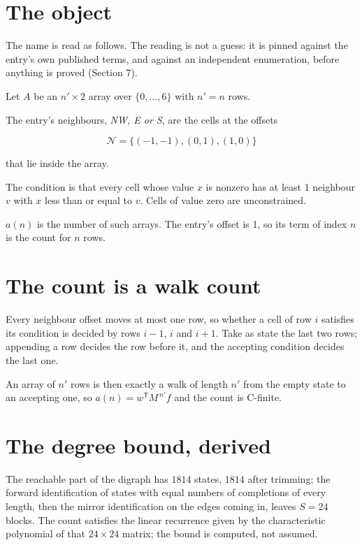 \documentclass[11pt]{article}
\theoremstyle{definition}
\begin{document}
\section{The object}

The name is read as follows. The reading is not a guess: it is pinned against the entry's own published terms, and against an independent enumeration, before anything is proved (Section 7).

Let $A$ be an $n' \times 2$ array over $\{0,\dots,6\}$ with $n' = n$ rows.

The entry's neighbours, {\itshape NW, E or S}, are the cells at the offsets

\[\mathcal{N} = \{(-1,-1), (0,1), (1,0)\}\]

that lie inside the array.

The condition is that every cell whose value $x$ is nonzero has at least 1 neighbour $v$ with $x$ less than or equal to $v$. Cells of value zero are unconstrained.

$a(n)$ is the number of such arrays. The entry's offset is 1, so its term of index $n$ is the count for $n$ rows.

\section{The count is a walk count}

Every neighbour offset moves at most one row, so whether a cell of row $i$ satisfies its condition is decided by rows $i-1$, $i$ and $i+1$. Take as state the last two rows; appending a row decides the row before it, and the accepting condition decides the last one.

An array of $n'$ rows is then exactly a walk of length $n'$ from the empty state to an accepting one, so $a(n) = w^{\mathsf T}M^{\,n'}f$ and the count is C-finite.

\section{The degree bound, derived}

The reachable part of the digraph has $1814$ states, $1814$ after trimming; the forward identification of states with equal numbers of completions of every length, then the mirror identification on the edges coming in, leaves $S = 24$ blocks. The count satisfies the linear recurrence given by the characteristic polynomial of that $24\times24$ matrix; the bound is computed, not assumed.
\end{document}
